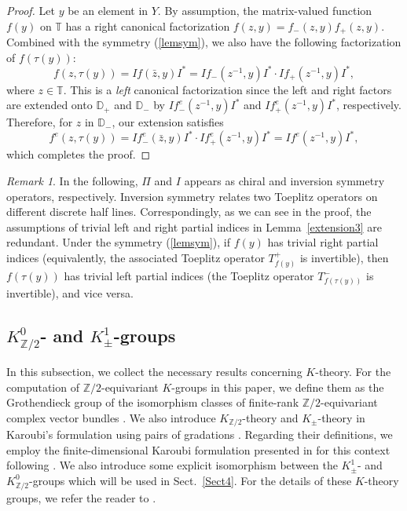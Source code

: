 \documentclass{amsart}
\theoremstyle{plain}
\theoremstyle{definition}
\theoremstyle{remark}
\newtheorem{remark}[theorem]{Remark}
\newcommand{\Z}{\mathbb{Z}}
\newcommand{\T}{\mathbb{T}}
\newcommand{\D}{\mathbb{D}}
\begin{document}
\begin{proof}
Let $y$ be an element in $Y$.
By assumption, the matrix-valued function $f(y)$ on $\T$ has a right canonical factorization $f(z,y) = f_-(z,y)f_+(z,y)$.
Combined with the symmetry (\ref{lemsym}), we also have the following factorization of $f(\tau(y))$:
\begin{equation*}
	f(z,\tau(y)) = I f(\bar{z}, y)I^*
		= I f_-(z^{-1}, y)I^* \cdot I f_+(z^{-1}, y) I^*,
\end{equation*}
where $z \in \T$.
This is a {\em left} canonical factorization since the left and right factors are extended onto $\D_+$ and $\D_-$ by $I f_-^e(z^{-1}, y)I^*$ and $I f_+^e(z^{-1}, y)I^*$, respectively.
Therefore, for $z$ in $\D_-$, our extension satisfies
\begin{equation*}
	f^e(z,\tau(y)) = I f^e_-(\bar{z}, y)I^* \cdot I f^e_+(z^{-1}, y) I^*
		= I f^e(z^{-1}, y) I^*,
\end{equation*}
which completes the proof.
\end{proof}

\begin{remark}
\label{reminv}
In the following, $\Pi$ and $I$ appears as chiral and inversion symmetry operators, respectively. 
Inversion symmetry relates two Toeplitz operators on different discrete half lines.
Correspondingly, as we can see in the proof, the assumptions of trivial left and right partial indices in Lemma~\ref{extension3} are redundant.
Under the symmetry (\ref{lemsym}), if $f(y)$ has trivial right partial indices (equivalently, the associated Toeplitz operator $T^+_{f(y)}$ is invertible), then $f(\tau(y))$ has trivial left partial indices (the Toeplitz operator $T^-_{f(\tau(y))}$ is invertible), and vice versa.
\end{remark}

\subsection{$K^0_{\Z/2}$- and $K^1_\pm$-groups}
\label{Sect2.3}
In this subsection, we collect the necessary results concerning $K$-theory.
For the computation of $\Z/2$-equivariant $K$-groups in this paper, we define them as the Grothendieck group of the isomorphism classes of finite-rank $\Z/2$-equivariant complex vector bundles \cite{At67,Se68}.
We also introduce $K_{\Z/2}$-theory and $K_\pm$-theory in Karoubi's formulation using pairs of gradations \cite{Karoubi68, Karoubi78}.
Regarding their definitions, we employ the finite-dimensional Karoubi formulation presented in \cite{Gomi23} for this context following \cite{FM13}.
We also introduce some explicit isomorphism between the $K^1_\pm$- and $K^0_{\Z/2}$-groups which will be used in Sect.~\ref{Sect4}.
For the details of these $K$-theory groups, we refer the reader to \cite{Karoubi68,Se68,Karoubi78,AH04,Gomi15,Gomi23}.
\end{document}
